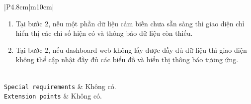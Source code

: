 \begin{longtable}{|P{4.8cm}|m{10cm}|}
\begin{enumerate}[label = E\arabic*:]
		\item Tại bước 2, nếu một phần dữ liệu cảm biến chưa sẵn sàng thì giao diện chỉ hiển thị các chỉ số hiện có và thông báo dữ liệu còn thiếu.
		\item Tại bước 2, nếu dashboard web không lấy được đầy đủ dữ liệu thì giao diện không thể cập nhật đầy đủ các biểu đồ và hiển thị thông báo tương ứng.
	\end{enumerate}
	\\
	\hline
	\texttt{Special requirements} & Không có.\\
	\hline
	\texttt{Extension points} & Không có.\\
	\hline

	\caption{\label{table5}Đặc tả cho Use-case Theo dõi dữ liệu môi trường trên dashboard web}
\end{longtable}
